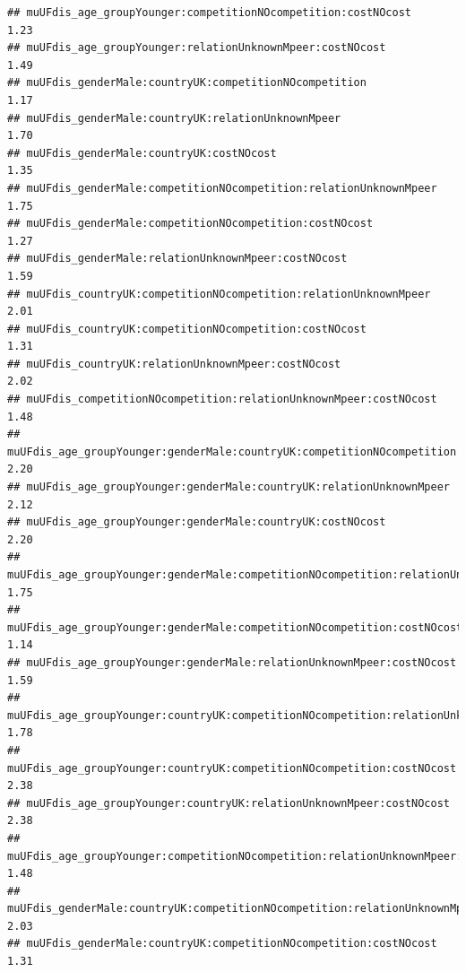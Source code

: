 \documentclass[
]{article}
\begin{document}
\begin{verbatim}
## muUFdis_age_groupYounger:competitionNOcompetition:costNOcost                                           1.23
## muUFdis_age_groupYounger:relationUnknownMpeer:costNOcost                                               1.49
## muUFdis_genderMale:countryUK:competitionNOcompetition                                                  1.17
## muUFdis_genderMale:countryUK:relationUnknownMpeer                                                      1.70
## muUFdis_genderMale:countryUK:costNOcost                                                                1.35
## muUFdis_genderMale:competitionNOcompetition:relationUnknownMpeer                                       1.75
## muUFdis_genderMale:competitionNOcompetition:costNOcost                                                 1.27
## muUFdis_genderMale:relationUnknownMpeer:costNOcost                                                     1.59
## muUFdis_countryUK:competitionNOcompetition:relationUnknownMpeer                                        2.01
## muUFdis_countryUK:competitionNOcompetition:costNOcost                                                  1.31
## muUFdis_countryUK:relationUnknownMpeer:costNOcost                                                      2.02
## muUFdis_competitionNOcompetition:relationUnknownMpeer:costNOcost                                       1.48
## muUFdis_age_groupYounger:genderMale:countryUK:competitionNOcompetition                                 2.20
## muUFdis_age_groupYounger:genderMale:countryUK:relationUnknownMpeer                                     2.12
## muUFdis_age_groupYounger:genderMale:countryUK:costNOcost                                               2.20
## muUFdis_age_groupYounger:genderMale:competitionNOcompetition:relationUnknownMpeer                      1.75
## muUFdis_age_groupYounger:genderMale:competitionNOcompetition:costNOcost                                1.14
## muUFdis_age_groupYounger:genderMale:relationUnknownMpeer:costNOcost                                    1.59
## muUFdis_age_groupYounger:countryUK:competitionNOcompetition:relationUnknownMpeer                       1.78
## muUFdis_age_groupYounger:countryUK:competitionNOcompetition:costNOcost                                 2.38
## muUFdis_age_groupYounger:countryUK:relationUnknownMpeer:costNOcost                                     2.38
## muUFdis_age_groupYounger:competitionNOcompetition:relationUnknownMpeer:costNOcost                      1.48
## muUFdis_genderMale:countryUK:competitionNOcompetition:relationUnknownMpeer                             2.03
## muUFdis_genderMale:countryUK:competitionNOcompetition:costNOcost                                       1.31

\end{verbatim}
\end{document}
